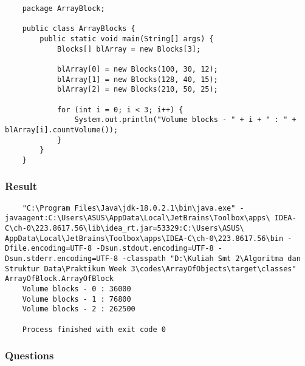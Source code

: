\documentclass[12pt,titlepage]{article}
\begin{document}
\begin{verbatim}
    package ArrayBlock;

    public class ArrayBlocks {
        public static void main(String[] args) {
            Blocks[] blArray = new Blocks[3];

            blArray[0] = new Blocks(100, 30, 12);
            blArray[1] = new Blocks(128, 40, 15);
            blArray[2] = new Blocks(210, 50, 25);

            for (int i = 0; i < 3; i++) {
                System.out.println("Volume blocks - " + i + " : " + blArray[i].countVolume());
            }
        }
    }
\end{verbatim}

\subsubsection{Result}

\begin{verbatim}
    "C:\Program Files\Java\jdk-18.0.2.1\bin\java.exe" - javaagent:C:\Users\ASUS\AppData\Local\JetBrains\Toolbox\apps\ IDEA-C\ch-0\223.8617.56\lib\idea_rt.jar=53329:C:\Users\ASUS\ AppData\Local\JetBrains\Toolbox\apps\IDEA-C\ch-0\223.8617.56\bin -Dfile.encoding=UTF-8 -Dsun.stdout.encoding=UTF-8 -Dsun.stderr.encoding=UTF-8 -classpath "D:\Kuliah Smt 2\Algoritma dan Struktur Data\Praktikum Week 3\codes\ArrayOfObjects\target\classes" ArrayOfBlock.ArrayOfBlock
    Volume blocks - 0 : 36000
    Volume blocks - 1 : 76800
    Volume blocks - 2 : 262500

    Process finished with exit code 0

\end{verbatim}

\subsubsection{Questions}
\end{document}
